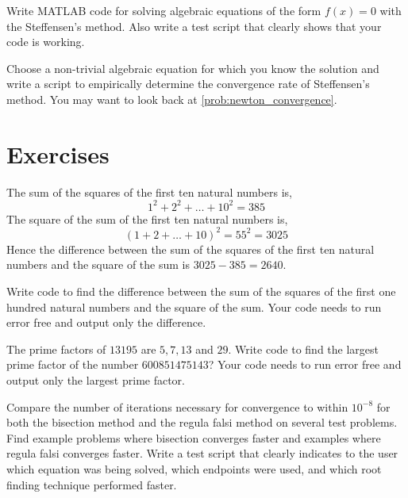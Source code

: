 \begin{problem}
    Write MATLAB code for solving algebraic equations of the form $f(x) = 0$ with the
    Steffensen's method.  Also write a test script that clearly shows that your code is working.
\end{problem}

\begin{problem}
    Choose a non-trivial algebraic equation for which you know the solution and write a
    script to empirically determine the convergence rate of Steffensen's method.  You may want to
    look back at \ref{prob:newton_convergence}.
\end{problem}

\section{Exercises}

\begin{problem}
    The sum of the squares of the first ten natural numbers is,
    \[ 1^2 + 2^2 + \dots + 10^2 = 385 \]
    The square of the sum of the first ten natural numbers is,
    \[ (1 + 2 + \dots + 10)^2 = 55^2 = 3025 \]
    Hence the difference between the sum of the squares of the first ten natural numbers
    and the square of the sum is $3025 − 385 = 2640$.

    Write code to find the difference between the sum of the squares of the first one
    hundred natural numbers and the square of the sum.  Your code needs to run error free
    and output only the difference.  
\end{problem}

\begin{problem}
    The prime factors of $13195$ are $5, 7, 13$ and $29$.  Write
    code to find the largest prime factor of the number $600851475143$? Your code needs to
    run error free and output only the largest prime factor. 
\end{problem}

\begin{problem}
    Compare the number of iterations necessary for convergence to within $10^{-8}$ for
    both the bisection method and the regula falsi method on several test problems. Find
    example problems where bisection converges faster and examples where regula falsi
    converges faster. Write a test script that clearly indicates to the user which
    equation was being solved, which endpoints were used, and which root finding technique
    performed faster.
\end{problem}


